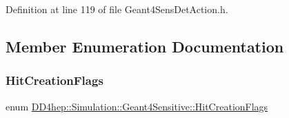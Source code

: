 Definition at line 119 of file Geant4\+Sens\+Det\+Action.\+h.



\subsection{Member Enumeration Documentation}
\hypertarget{class_d_d4hep_1_1_simulation_1_1_geant4_sensitive_a496cf61e393c9c2f096f60a4ee20c750}{}\label{class_d_d4hep_1_1_simulation_1_1_geant4_sensitive_a496cf61e393c9c2f096f60a4ee20c750} 
\subsubsection{\texorpdfstring{Hit\+Creation\+Flags}{HitCreationFlags}}
{\footnotesize\ttfamily enum \hyperlink{class_d_d4hep_1_1_simulation_1_1_geant4_sensitive_a496cf61e393c9c2f096f60a4ee20c750}{D\+D4hep\+::\+Simulation\+::\+Geant4\+Sensitive\+::\+Hit\+Creation\+Flags}}

